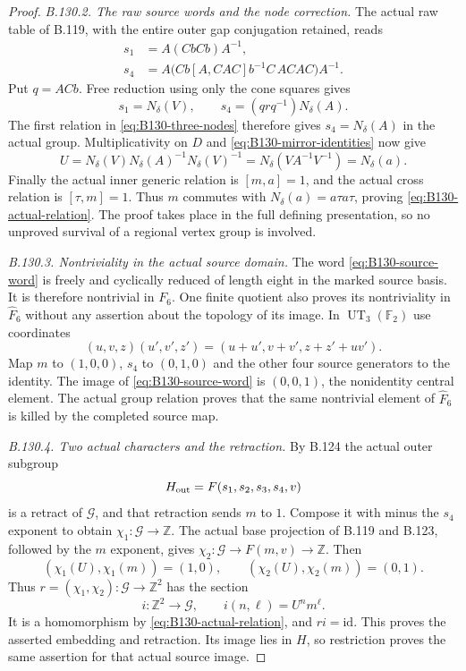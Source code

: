 \begin{proof}
\emph{B.130.2. The raw source words and the node correction.}
The actual raw table of B.119, with the entire outer gap
conjugation retained, reads
\begin{equation}\label{eq:B130-raw-sources}
\begin{aligned}
 s_1&=A(CbCb)A^{-1},\\
 s_4&=A\bigl(Cb[A,CAC]b^{-1}C\,ACAC\bigr)A^{-1}.
\end{aligned}
\end{equation}
Put $q=ACb$. Free reduction using only the cone squares gives
\begin{equation}\label{eq:B130-raw-correction}
 s_1=N_\delta(V),\qquad
 s_4=(qrq^{-1})N_\delta(A).
\end{equation}
The first relation in \eqref{eq:B130-three-nodes} therefore gives
$s_4=N_\delta(A)$ in the actual group. Multiplicativity on $D$
and \eqref{eq:B130-mirror-identities} now give
\[
 U=N_\delta(V)N_\delta(A)^{-1}N_\delta(V)^{-1}
   =N_\delta(VA^{-1}V^{-1})=N_\delta(a).
\]
Finally the actual inner generic relation is $[m,a]=1$, and
the actual cross relation is $[\tau,m]=1$. Thus $m$ commutes
with $N_\delta(a)=a\tau a\tau$, proving
\eqref{eq:B130-actual-relation}. The proof takes place in the
full defining presentation, so no unproved survival of a
regional vertex group is involved.

\emph{B.130.3. Nontriviality in the actual source domain.}
The word \eqref{eq:B130-source-word} is freely and cyclically
reduced of length eight in the marked source basis. It is
therefore nontrivial in $F_6$. One finite quotient also proves
its nontriviality in $\widehat F_6$ without any assertion about
the topology of its image. In
$\operatorname{UT}_3(\mathbb F_2)$ use coordinates
\[
 (u,v,z)(u',v',z')=(u+u',v+v',z+z'+uv').
\]
Map $m$ to $(1,0,0)$, $s_4$ to $(0,1,0)$ and the other four
source generators to the identity. The image of
\eqref{eq:B130-source-word} is $(0,0,1)$, the nonidentity
central element. The actual group relation proves that the
same nontrivial element of $\widehat F_6$ is killed by the
completed source map.

\emph{B.130.4. Two actual characters and the retraction.}
By B.124 the actual outer subgroup
\[
 H_{\rm out}=F(s_1,s_2,s_3,s_4,v)
\]
is a retract of $\mathcal G$, and that retraction sends $m$ to
$1$. Compose it with minus the $s_4$ exponent to obtain
$\chi_1:\mathcal G\to\mathbb Z$. The actual base projection
of B.119 and B.123, followed by the $m$ exponent, gives
$\chi_2:\mathcal G\to F(m,v)\to\mathbb Z$. Then
\[
 (\chi_1(U),\chi_1(m))=(1,0),\qquad
 (\chi_2(U),\chi_2(m))=(0,1).
\]
Thus $r=(\chi_1,\chi_2):\mathcal G\to\mathbb Z^2$ has the
section
\[
 i:\mathbb Z^2\longrightarrow\mathcal G,
 \qquad i(n,\ell)=U^n m^\ell.
\]
It is a homomorphism by \eqref{eq:B130-actual-relation}, and
$ri=\mathrm{id}$. This proves the asserted embedding and
retraction. Its image lies in $H$, so restriction proves the
same assertion for that actual source image.


\end{proof}
